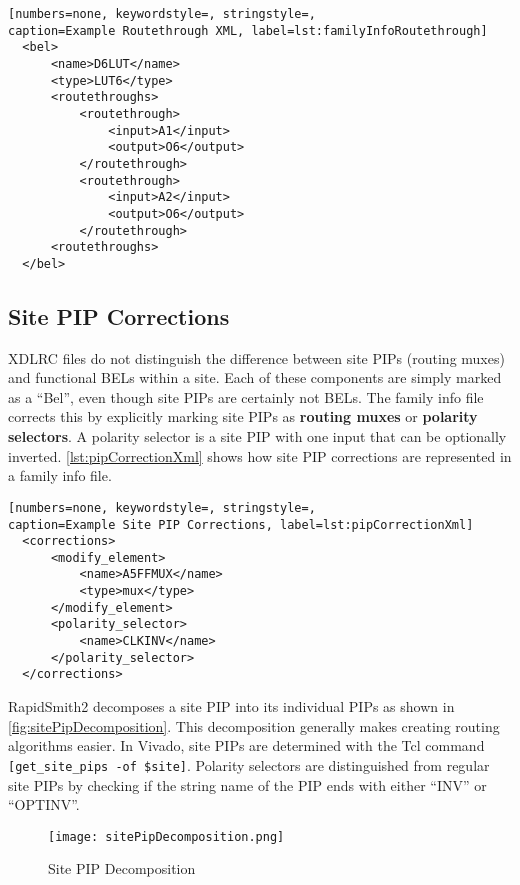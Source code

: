 \begin{lstlisting}[numbers=none, keywordstyle=, stringstyle=,
caption=Example Routethrough XML, label=lst:familyInfoRoutethrough]
  <bel>
      <name>D6LUT</name>
      <type>LUT6</type>
      <routethroughs>
          <routethrough>
              <input>A1</input>
              <output>O6</output>
          </routethrough>
          <routethrough>
              <input>A2</input>
              <output>O6</output>
          </routethrough>
      <routethroughs>
  </bel>
\end{lstlisting}

\subsection{Site PIP Corrections}
XDLRC files do not distinguish the difference between site PIPs (routing muxes)
and functional BELs within a site. Each of these components are simply marked
as a ``Bel'', even though site PIPs are certainly not BELs. The family info file
corrects this by explicitly marking site PIPs as \textbf{routing muxes} or
\textbf{polarity selectors}. A polarity selector is a site PIP with one
input that can be optionally inverted. \autoref{lst:pipCorrectionXml} shows how
site PIP corrections are represented in a family info file.

\begin{lstlisting}[numbers=none, keywordstyle=, stringstyle=,
caption=Example Site PIP Corrections, label=lst:pipCorrectionXml]
  <corrections>
      <modify_element> 
          <name>A5FFMUX</name> 
          <type>mux</type> 
      </modify_element>
      <polarity_selector> 
          <name>CLKINV</name> 
      </polarity_selector>
  </corrections>
\end{lstlisting}

\noindent RapidSmith2 decomposes a site PIP into its individual PIPs as shown in
\autoref{fig:sitePipDecomposition}. This decomposition generally makes creating
routing algorithms easier. In Vivado, site PIPs are determined with the Tcl
command \texttt{[get\_site\_pi\-ps -of \$site]}. Polarity selectors are
distinguished from regular site PIPs by checking if the string name of the PIP
ends with either ``INV'' or ``OPTINV''.
  
\begin{figure}[H]
  \centering
  \texttt{[image: sitePipDecomposition.png]}
  \caption{Site PIP Decomposition}
  \label{fig:sitePipDecomposition}
\end{figure}

